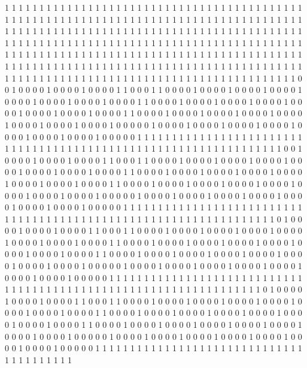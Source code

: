 1 1 1 1 1 1 1 1 1 1 1 1 1 1 1 1 1 1 1 1
1 1 1 1 1 1 1 1 1 1 1 1 1 1 1 1 1 1 1 1
1 1 1 1 1 1 1 1 1 1 1 1 1 1 1 1 1 1 1 1
1 1 1 1 1 1 1 1 1 1 1 1 1 1 1 1 1 1 1 1
1 1 1 1 1 1 1 1 1 1 1 1 1 1 1 1 1 1 1 1
1 1 1 1 1 1 1 1 1 1 1 1 1 1 1 1 1 1 1 1
1 1 1 1 1 1 1 1 1 1 1 1 1 1 1 1 1 1 1 1
1 1 1 1 1 1 1 1 1 1 1 1 1 1 1 1 1 1 1 1
1 1 1 1 1 1 1 1 1 1 1 1 1 1 1 1 1 1 1 1
1 1 1 1 1 1 1 1 1 1 1 1 1 1 1 1 1 1 1 1
1 1 1 1 1 1 1 1 1 1 1 1 1 1 1 1 1 1 1 1
1 1 1 1 1 1 1 1 1 1 1 1 1 1 1 1 1 1 1 1
1 1 1 1 1 1 1 1 1 1 1 1 1 1 1 1 1 1 1 1
1 1 1 1 1 1 1 1 1 1 1 1 1 1 1 1 1 1 1 1
1 1 1 1 1 1 1 1 1 1 1 1 1 1 1 1 1 1 1 1
0 0 1 0 0 0 0 1 0 0 0 0 1 0 0 0 0 1 1 0
0 0 1 1 0 0 0 0 1 0 0 0 0 1 0 0 0 0 1 0
0 0 0 1 0 0 0 0 1 0 0 0 0 1 0 0 0 0 1 0
0 0 0 1 1 0 0 0 0 1 0 0 0 0 1 0 0 0 0 1
0 0 0 0 1 0 0 0 0 1 0 0 0 0 1 0 0 0 0 1
0 0 0 0 1 1 0 0 0 0 1 0 0 0 0 1 0 0 0 0
1 0 0 0 0 1 0 0 0 0 1 0 0 0 0 1 0 0 0 0
1 0 0 0 0 1 0 0 0 0 0 1 0 0 0 0 1 0 0 0
0 1 0 0 0 0 1 0 0 0 0 1 0 0 0 0 1 0 0 0
0 1 0 0 0 0 1 0 0 0 0 0 1 1 1 1 1 1 1 1
1 1 1 1 1 1 1 1 1 1 1 1 1 1 1 1 1 1 1 1
1 1 1 1 1 1 1 1 1 1 1 1 1 1 1 1 1 1 1 1
1 1 1 1 1 1 1 1 1 1 1 1 1 1 1 1 0 0 1 0
0 0 0 1 0 0 0 0 1 0 0 0 0 1 1 0 0 0 1 1
0 0 0 0 1 0 0 0 0 1 0 0 0 0 1 0 0 0 0 1
0 0 0 0 1 0 0 0 0 1 0 0 0 0 1 0 0 0 0 1
1 0 0 0 0 1 0 0 0 0 1 0 0 0 0 1 0 0 0 0
1 0 0 0 0 1 0 0 0 0 1 0 0 0 0 1 0 0 0 0
1 1 0 0 0 0 1 0 0 0 0 1 0 0 0 0 1 0 0 0
0 1 0 0 0 0 1 0 0 0 0 1 0 0 0 0 1 0 0 0
0 1 0 0 0 0 0 1 0 0 0 0 1 0 0 0 0 1 0 0
0 0 1 0 0 0 0 1 0 0 0 0 1 0 0 0 0 1 0 0
0 0 1 0 0 0 0 0 1 1 1 1 1 1 1 1 1 1 1 1
1 1 1 1 1 1 1 1 1 1 1 1 1 1 1 1 1 1 1 1
1 1 1 1 1 1 1 1 1 1 1 1 1 1 1 1 1 1 1 1
1 1 1 1 1 1 1 1 1 1 1 1 1 0 1 0 0 0 0 1
0 0 0 0 1 0 0 0 0 1 1 0 0 0 1 1 0 0 0 0
1 0 0 0 0 1 0 0 0 0 1 0 0 0 0 1 0 0 0 0
1 0 0 0 0 1 0 0 0 0 1 0 0 0 0 1 1 0 0 0
0 1 0 0 0 0 1 0 0 0 0 1 0 0 0 0 1 0 0 0
0 1 0 0 0 0 1 0 0 0 0 1 0 0 0 0 1 1 0 0
0 0 1 0 0 0 0 1 0 0 0 0 1 0 0 0 0 1 0 0
0 0 1 0 0 0 0 1 0 0 0 0 1 0 0 0 0 1 0 0
0 0 0 1 0 0 0 0 1 0 0 0 0 1 0 0 0 0 1 0
0 0 0 1 0 0 0 0 1 0 0 0 0 1 0 0 0 0 1 0
0 0 0 0 1 1 1 1 1 1 1 1 1 1 1 1 1 1 1 1
1 1 1 1 1 1 1 1 1 1 1 1 1 1 1 1 1 1 1 1
1 1 1 1 1 1 1 1 1 1 1 1 1 1 1 1 1 1 1 1
1 1 1 1 1 1 1 1 1 0 1 0 0 0 0 1 0 0 0 0
1 0 0 0 0 1 1 0 0 0 1 1 0 0 0 0 1 0 0 0
0 1 0 0 0 0 1 0 0 0 0 1 0 0 0 0 1 0 0 0
0 1 0 0 0 0 1 0 0 0 0 1 1 0 0 0 0 1 0 0
0 0 1 0 0 0 0 1 0 0 0 0 1 0 0 0 0 1 0 0
0 0 1 0 0 0 0 1 0 0 0 0 1 1 0 0 0 0 1 0
0 0 0 1 0 0 0 0 1 0 0 0 0 1 0 0 0 0 1 0
0 0 0 1 0 0 0 0 1 0 0 0 0 1 0 0 0 0 0 1
0 0 0 0 1 0 0 0 0 1 0 0 0 0 1 0 0 0 0 1
0 0 0 0 1 0 0 0 0 1 0 0 0 0 1 0 0 0 0 0
1 1 1 1 1 1 1 1 1 1 1 1 1 1 1 1 1 1 1 1
1 1 1 1 1 1 1 1 1 1 1 1 1 1 1 1 1 1 1 1

